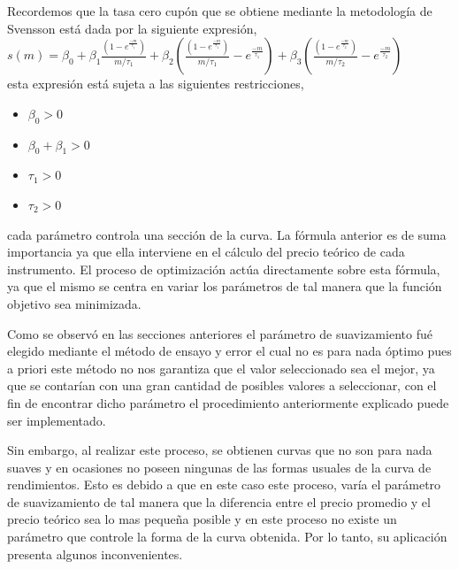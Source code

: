 \hspace{0.4cm} Recordemos que la tasa cero cup\'on que se obtiene mediante la metodolog\'ia de Svensson est\'a dada por la siguiente expresi\'on,\\


$\displaystyle{s(m) = \beta_{0}+ \beta_{1}\frac{\left(1-e^\frac{-m}{\tau_{1}}\right)}{m/\tau_{1}} + \beta_{2} \left(\frac{\left(1-e^\frac{-m}{\tau_{1}}\right)}{m/\tau_{1}} -  e^\frac{-m}{\tau_{1}}\right) + \beta_{3} \left(\frac{\left(1-e^\frac{-m}{\tau_{2}}\right)}{m/\tau_{2}} -  e^\frac{-m}{\tau_{2}}\right)}$\\

\noindent esta expresi\'on est\'a sujeta a las siguientes restricciones,

\begin{itemize}
  \item $\beta_{0} > 0$
  \item $\beta_{0}+\beta_{1} > 0$
  \item $\tau_{1} > 0$
  \item $\tau_{2} > 0$
\end{itemize}

\noindent cada par\'ametro controla una secci\'on de la curva. La f\'ormula anterior es de suma importancia ya que ella interviene en el c\'alculo del precio te\'orico de cada instrumento. El proceso de optimizaci\'on act\'ua directamente sobre esta f\'ormula, ya que el mismo se centra en variar los par\'ametros de tal manera que la funci\'on objetivo sea minimizada.

\hspace{0.4cm} Como se observ\'o en las secciones anteriores el par\'ametro de suavizamiento fu\'e elegido mediante el m\'etodo de ensayo y error el cual no es para nada \'optimo pues a priori este m\'etodo no nos garantiza que el valor seleccionado sea el mejor, ya que se contar\'ian con una gran cantidad de posibles valores a seleccionar, con el fin  de encontrar dicho par\'ametro el procedimiento anteriormente explicado puede ser implementado. 

\hspace{0.4cm} Sin embargo, al realizar este proceso, se obtienen curvas que no son para nada suaves y en ocasiones no poseen ningunas de las formas usuales de la curva de rendimientos. Esto es debido a que en este caso este proceso, var\'ia el par\'ametro de suavizamiento de tal manera que la diferencia entre el precio promedio y el precio te\'orico sea lo mas peque\~na posible y en este proceso no existe un par\'ametro que controle la forma de la curva obtenida. Por lo tanto, su aplicaci\'on presenta algunos inconvenientes.  





